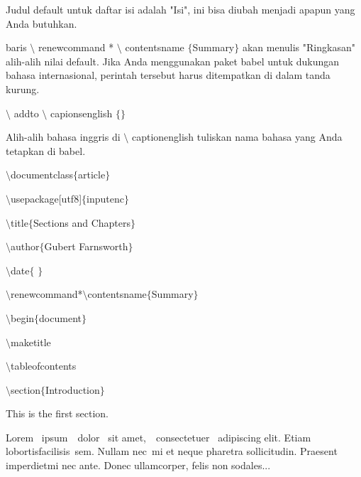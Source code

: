 \noindent Judul default untuk daftar isi adalah "Isi", ini bisa diubah menjadi apapun yang Anda butuhkan.\par


\noindent baris $\setminus$ renewcommand * $\setminus$ contentsname $ \{ $Summary$ \} $ akan menulis "Ringkasan" alih-alih nilai default. Jika Anda menggunakan paket babel untuk dukungan bahasa internasional, perintah tersebut harus ditempatkan di dalam tanda kurung.\par


\noindent $\setminus$ addto $\setminus$ capionsenglish $ \{ $$ \} $\par


\noindent Alih-alih bahasa inggris di $\setminus$ captionenglish tuliskan nama bahasa yang Anda tetapkan di babel.\par


\noindent \hspace*{0.5in}$\setminus$documentclass$ \{ $article$ \} $\par

$\setminus$usepackage[utf8]$ \{ $inputenc$ \} $\par

$\setminus$title$ \{ $Sections and Chapters$ \} $\par

$\setminus$author$ \{ $Gubert Farnsworth$ \} $\par

$\setminus$date$ \{ $ $ \} $\par

$\setminus$renewcommand*$\setminus$contentsname$ \{ $Summary$ \} $\par

$\setminus$begin$ \{ $document$ \} $\par

$\setminus$maketitle\par

$\setminus$tableofcontents\par

$\setminus$section$ \{ $Introduction$ \} $\par

This is the first section.\par


Lorem~ ipsum~~dolor~ sit  amet,~~consectetuer~ adipiscing  elit. Etiam~ lobortisfacilisis~sem.  Nullam nec~mi et neque pharetra sollicitudin.  Praesent imperdietmi nec ante. Donec ullamcorper, felis non sodales...\par



